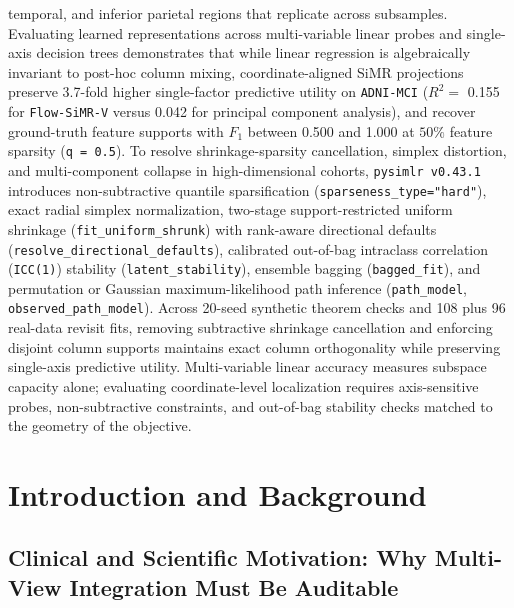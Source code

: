 \documentclass[
  10pt,
  letterpaper,
]{report}
\begin{document}
temporal, and inferior parietal regions that replicate across
subsamples. Evaluating learned representations across multi-variable
linear probes and single-axis decision trees demonstrates that while
linear regression is algebraically invariant to post-hoc column mixing,
coordinate-aligned SiMR projections preserve 3.7-fold higher
single-factor predictive utility on \texttt{ADNI-MCI} (\(R^2 =\) 0.155
for \texttt{Flow-SiMR-V} versus 0.042 for principal component analysis),
and recover ground-truth feature supports with \(F_1\) between 0.500 and
1.000 at \(50\%\) feature sparsity (\texttt{q\ =\ 0.5}). To resolve
shrinkage-sparsity cancellation, simplex distortion, and multi-component
collapse in high-dimensional cohorts, \texttt{pysimlr\ v0.43.1}
introduces non-subtractive quantile sparsification
(\texttt{sparseness\_type="hard"}), exact radial simplex normalization,
two-stage support-restricted uniform shrinkage
(\texttt{fit\_uniform\_shrunk}) with rank-aware directional defaults
(\texttt{resolve\_directional\_defaults}), calibrated out-of-bag
intraclass correlation (\texttt{ICC(1)}) stability
(\texttt{latent\_stability}), ensemble bagging (\texttt{bagged\_fit}),
and permutation or Gaussian maximum-likelihood path inference
(\texttt{path\_model}, \texttt{observed\_path\_model}). Across 20-seed
synthetic theorem checks and 108 plus 96 real-data revisit fits,
removing subtractive shrinkage cancellation and enforcing disjoint
column supports maintains exact column orthogonality while preserving
single-axis predictive utility. Multi-variable linear accuracy measures
subspace capacity alone; evaluating coordinate-level localization
requires axis-sensitive probes, non-subtractive constraints, and
out-of-bag stability checks matched to the geometry of the objective.


\chapter{Introduction and Background}\label{introduction-and-background}

\section{Clinical and Scientific Motivation: Why Multi-View Integration
Must Be
Auditable}\label{clinical-and-scientific-motivation-why-multi-view-integration-must-be-auditable}
\end{document}

